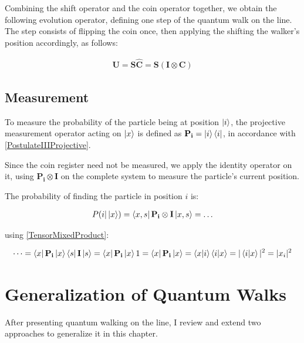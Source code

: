 
Combining the shift operator and the coin operator together, we obtain the following evolution operator, defining one step of the quantum walk on the line. The step consists of flipping the coin once, then applying the shifting the walker's position accordingly, as follows:

\begin{align*}
    \mathbf{U} = \mathbf{S}\mathbf{\hat{C}} = \mathbf{S}(\mathbf{I}\otimes{}\mathbf{C})
\end{align*}

\subsection{Measurement}

To measure the probability of the particle being at position $\ket{i}$, the projective measurement operator acting on $\ket{x}$ is defined as $\mathbf{P_i} = \ket{i}\bra{i}$, in accordance with \hyperref[PostulateIIIProjective]{[PostulateIIIProjective]}.

Since the coin register need not be measured, we apply the identity operator on it, using $\mathbf{P_i} \otimes \mathbf{I}$ on the complete system to measure the particle's current position.

The probability of finding the particle in position $i$ is:

\begin{gather*}
    P(i | \ket{x}) = \bra{x,s}\mathbf{P_i}\otimes{}\mathbf{I}\ket{x,s} = \dots
\end{gather*}

using \hyperref[TensorMixedProduct]{[TensorMixedProduct]}:

\begin{gather*}
    \dots = \bra{x}\mathbf{P_i}\ket{x}\bra{s}\mathbf{I}\ket{s} =
    \bra{x}\mathbf{P_i}\ket{x}1 =
    \bra{x}\mathbf{P_i}\ket{x} =
    \bra{x}\ket{i}\bra{i}\ket{x} =
    |\bra{i}\ket{x}|^2 =
    |x_i|^2
\end{gather*}

\section{Generalization of Quantum Walks}

After presenting quantum walking on the line, I review and extend two approaches to generalize it in this chapter.

